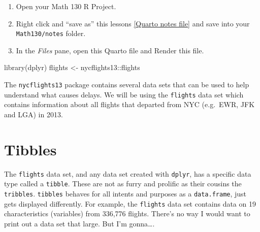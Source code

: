 \documentclass[
  letterpaper,
  DIV=11,
  numbers=noendperiod,
  oneside]{scrreprt}
\newenvironment{Shaded}{\begin{snugshade}}{\end{snugshade}}
\newcommand{\FunctionTok}[1]{\textcolor[rgb]{0.28,0.35,0.67}{#1}}
\newcommand{\NormalTok}[1]{\textcolor[rgb]{0.00,0.23,0.31}{#1}}
\newcommand{\OtherTok}[1]{\textcolor[rgb]{0.00,0.23,0.31}{#1}}
\newcommand{\SpecialCharTok}[1]{\textcolor[rgb]{0.37,0.37,0.37}{#1}}
\providecommand{\tightlist}{%
  \setlength{\itemsep}{0pt}\setlength{\parskip}{0pt}}\usepackage{longtable,booktabs,array}
\begin{document}
\begin{tcolorbox}[enhanced jigsaw, bottomrule=.15mm, colback=white, colframe=quarto-callout-tip-color-frame, toprule=.15mm, coltitle=black, rightrule=.15mm, opacitybacktitle=0.6, colbacktitle=quarto-callout-tip-color!10!white, toptitle=1mm, leftrule=.75mm, breakable, bottomtitle=1mm, titlerule=0mm, title={👉 Prepare}, arc=.35mm, left=2mm, opacityback=0]

\begin{enumerate}
\def\labelenumi{\arabic{enumi}.}
\tightlist
\item
  Open your Math 130 R Project.
\item
  Right click and ``save as'' this lessons
  \href{notes/dplyr_notes.qmd}{{[}Quarto notes file{]}} and save into
  your \texttt{Math130/notes} folder.
\item
  In the \emph{Files} pane, open this Quarto file and Render this file.
\end{enumerate}

\end{tcolorbox}

\begin{Shaded}
\begin{Highlighting}[]
\FunctionTok{library}\NormalTok{(dplyr)}
\NormalTok{flights }\OtherTok{\textless{}{-}}\NormalTok{ nycflights13}\SpecialCharTok{::}\NormalTok{flights}
\end{Highlighting}
\end{Shaded}

The \texttt{nycflights13} package contains several data sets that can be
used to help understand what causes delays. We will be using the
\texttt{flights} data set which contains information about all flights
that departed from NYC (e.g.~EWR, JFK and LGA) in 2013.

\section{Tibbles}\label{sec-tibble}

The \texttt{flights} data set, and any data set created with
\texttt{dplyr}, has a specific data type called a \texttt{tibble}. These
are not as furry and prolific as their cousins the \texttt{tribbles}.
\texttt{tibbles} behaves for all intents and purposes as a
\texttt{data.frame}, just gets displayed differently. For example, the
\texttt{flights} data set contains data on 19 characteristics
(variables) from 336,776 flights. There's no way I would want to print
out a data set that large. But I'm gonna\ldots.
\end{document}
